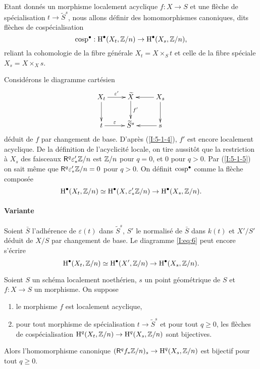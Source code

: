 \documentclass[oneside]{book}
\begin{document}
\subsubsection{}\label{I:5-1-6}

Etant donnés un morphisme localement acyclique $f:X\to S$ et une flèche de 
spécialisation $t\to \widetilde S^s$, nous allons définir des 
homomorphismes canoniques, dits flèches de cospécialisation 
\[
  \operatorname{cosp}^\bullet : \operatorname{H}^\bullet(X_t,\mathbb{Z}/n) \to \operatorname{H}^\bullet(X_s,\mathbb{Z}/n)\text{,}
\]
reliant la cohomologie de la fibre générale $X_t=X\times_S t$ et celle de la 
fibre spéciale $X_s=X\times_X s$. 

Considérons le diagramme cartésien 
\[\xymatrix{
  X_t \ar[d] \ar[r]^-{\varepsilon'} 
    & \widetilde X \ar[d]^-{f'} 
    & \ar[l] X_s \ar[d] \\
  t \ar[r]^-\varepsilon 
    & \widetilde S^s 
    & \ar[l] s
}\]
déduit de $f$ par changement de base. D'après (\ref{I:5-1-4}), $f'$ est encore 
localement acyclique. De la définition de l'acyclicité locale, on tire 
aussitôt que la restriction à $X_s$ des faisceaux $\mathsf{R}^q \varepsilon_*' \mathbb{Z}/n$ 
est $\mathbb{Z}/n$ pour $q=0$, et $0$ pour $q>0$. Par (\ref{I:5-1-5}) on sait même que 
$\mathsf{R}^q \varepsilon_*'\mathbb{Z}/n = 0$ pour $q>0$. On définit $\operatorname{cosp}^\bullet$ comme la 
flèche composée 
\begin{equation}\label{I:eq:6}
  \operatorname{H}^\bullet(X_t,\mathbb{Z}/n) \simeq \operatorname{H}^\bullet(X,\varepsilon_*' \mathbb{Z}/n) \to \operatorname{H}^\bullet(X_s,\mathbb{Z}/n) \text{.}
\end{equation}

\paragraph{Variante}
Soient $\bar S$ l'adhérence de $\varepsilon(t)$ dans $\widetilde S^s$, $S'$ le 
normalisé de $\bar S$ dans $k(t)$ et $X'/S'$ déduit de $X/S$ par changement 
de base. Le diagramme \eqref{I:eq:6} peut encore s'écrire 
\[
  \operatorname{H}^\bullet(X_t,\mathbb{Z}/n) \simeq \operatorname{H}^\bullet(X',\mathbb{Z}/n) \to \operatorname{H}^\bullet(X_s,\mathbb{Z}/n) \text{.}
\]





\begin{theorem}\label{I:5-1-7}
Soient $S$ un schéma localement noethérien, $s$ un point géométrique de 
$S$ et $f:X\to S$ un morphisme. On suppose 
\begin{enumerate}[\indent a)]
  \item le morphisme $f$ est localement acyclique, 
  \item pour tout morphisme de spécialisation $t\to \widetilde S^s$ et pour 
    tout $q\geqslant 0$, les flèches de cospécialisation 
    $\operatorname{H}^q(X_t,\mathbb{Z}/n) \to \operatorname{H}^q(X_s,\mathbb{Z}/n)$ sont bijectives.
\end{enumerate}

Alors l'homomorphisme canonique $(\mathsf{R}^q f_*\mathbb{Z}/n)_s\to \operatorname{H}^q(X_s,\mathbb{Z}/n)$ est 
bijectif pour tout $q\geqslant 0$. 
\end{theorem}
\end{document}
